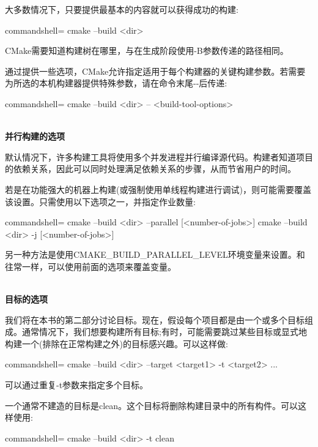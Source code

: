 大多数情况下，只要提供最基本的内容就可以获得成功的构建:

\begin{tcblisting}{commandshell={}}
cmake --build <dir>
\end{tcblisting}

CMake需要知道构建树在哪里，与在生成阶段使用-B参数传递的路径相同。

通过提供一些选项，CMake允许指定适用于每个构建器的关键构建参数。若需要为所选的本机构建器提供特殊参数，请在命令末尾-{}-后传递:

\begin{tcblisting}{commandshell={}}
cmake --build <dir> -- <build-tool-options>
\end{tcblisting}

\hspace*{\fill} \\ %
\noindent
\textbf{并行构建的选项}

默认情况下，许多构建工具将使用多个并发进程并行编译源代码。构建者知道项目的依赖关系，因此可以同时处理满足依赖关系的步骤，从而节省用户的时间。

若是在功能强大的机器上构建(或强制使用单线程构建进行调试)，则可能需要覆盖该设置。只需使用以下选项之一，并指定作业数量:

\begin{tcblisting}{commandshell={}}
cmake --build <dir> --parallel [<number-of-jobs>]
cmake --build <dir> -j [<number-of-jobs>]
\end{tcblisting}

另一种方法是使用CMAKE\_BUILD\_PARALLEL\_LEVEL环境变量来设置。和往常一样，可以使用前面的选项来覆盖变量。

\hspace*{\fill} \\ %
\noindent
\textbf{目标的选项}

我们将在本书的第二部分讨论目标。现在，假设每个项目都是由一个或多个目标组成。通常情况下，我们想要构建所有目标;有时，可能需要跳过某些目标或显式地构建一个(排除在正常构建之外)的目标感兴趣。可以这样做:

\begin{tcblisting}{commandshell={}}
cmake --build <dir> --target <target1> -t <target2> ...
\end{tcblisting}

可以通过重复-t参数来指定多个目标。

一个通常不建造的目标是clean。这个目标将删除构建目录中的所有构件。可以这样使用:

\begin{tcblisting}{commandshell={}}
cmake --build <dir> -t clean
\end{tcblisting}

